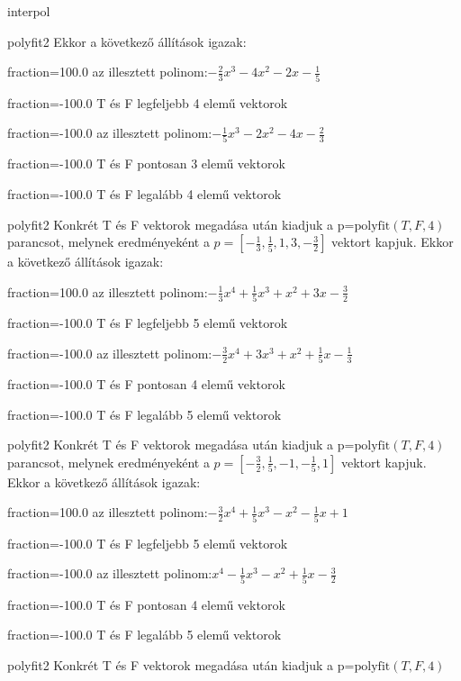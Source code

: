 \documentclass[12pt]{article}
\begin{document}
\begin{quiz}{interpol}
\begin{multi}[multiple]{polyfit2}
Ekkor a következő állítások igazak:
\item[fraction=100.0] az illesztett polinom:$-\frac{2}{3}x^3-4x^2-2x-\frac{1}{5}$
\item[fraction=-100.0]  T és F legfeljebb 4 elemű vektorok
\item[fraction=-100.0]  az illesztett polinom:$-\frac{1}{5}x^3-2x^2-4x-\frac{2}{3}$
\item[fraction=-100.0]  T és F pontosan 3 elemű vektorok
\item[fraction=-100.0] T és F legalább 4 elemű vektorok
\end{multi}
\begin{multi}[multiple]{polyfit2}
Konkrét T és F vektorok megadása után kiadjuk a p=$\mathrm{polyfit}(T,F,4)$
parancsot, melynek eredményeként a $p=\left[-\frac{1}{3},\frac{1}{5},1,3,-\frac{3}{2}\right]$ vektort kapjuk.
Ekkor a következő állítások igazak:
\item[fraction=100.0] az illesztett polinom:$-\frac{1}{3}x^4+\frac{1}{5}x^3+x^2+3x-\frac{3}{2}$
\item[fraction=-100.0]  T és F legfeljebb 5 elemű vektorok
\item[fraction=-100.0]  az illesztett polinom:$-\frac{3}{2}x^4+3x^3+x^2+\frac{1}{5}x-\frac{1}{3}$
\item[fraction=-100.0]  T és F pontosan 4 elemű vektorok
\item[fraction=-100.0] T és F legalább 5 elemű vektorok
\end{multi}
\begin{multi}[multiple]{polyfit2}
Konkrét T és F vektorok megadása után kiadjuk a p=$\mathrm{polyfit}(T,F,4)$
parancsot, melynek eredményeként a $p=\left[-\frac{3}{2},\frac{1}{5},-1,-\frac{1}{5},1\right]$ vektort kapjuk.
Ekkor a következő állítások igazak:
\item[fraction=100.0] az illesztett polinom:$-\frac{3}{2}x^4+\frac{1}{5}x^3-x^2-\frac{1}{5}x+1$
\item[fraction=-100.0]  T és F legfeljebb 5 elemű vektorok
\item[fraction=-100.0]  az illesztett polinom:$x^4-\frac{1}{5}x^3-x^2+\frac{1}{5}x-\frac{3}{2}$
\item[fraction=-100.0]  T és F pontosan 4 elemű vektorok
\item[fraction=-100.0] T és F legalább 5 elemű vektorok
\end{multi}
\begin{multi}[multiple]{polyfit2}
Konkrét T és F vektorok megadása után kiadjuk a p=$\mathrm{polyfit}(T,F,4)$

\end{multi}
\end{quiz}
\end{document}
